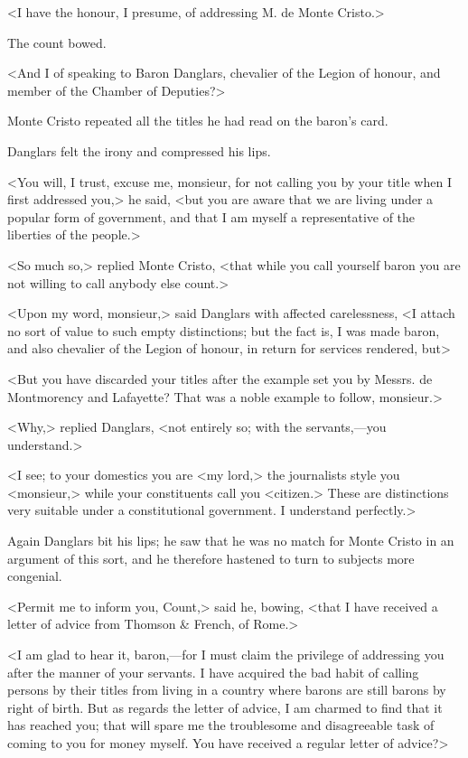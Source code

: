  <I have the honour, I presume, of addressing M. de Monte Cristo.> 

 The count bowed. 

 <And I of speaking to Baron Danglars, chevalier of the Legion of honour, and member of the Chamber of Deputies?> 

 Monte Cristo repeated all the titles he had read on the baron's card. 

 Danglars felt the irony and compressed his lips. 

 <You will, I trust, excuse me, monsieur, for not calling you by your title when I first addressed you,> he said, <but you are aware that we are living under a popular form of government, and that I am myself a representative of the liberties of the people.> 

 <So much so,> replied Monte Cristo, <that while you call yourself baron you are not willing to call anybody else count.> 

 <Upon my word, monsieur,> said Danglars with affected carelessness, <I attach no sort of value to such empty distinctions; but the fact is, I was made baron, and also chevalier of the Legion of honour, in return for services rendered, but\longdash> 

 <But you have discarded your titles after the example set you by Messrs. de Montmorency and Lafayette? That was a noble example to follow, monsieur.> 

 <Why,> replied Danglars, <not entirely so; with the servants,—you understand.> 

 <I see; to your domestics you are <my lord,> the journalists style you <monsieur,> while your constituents call you <citizen.> These are distinctions very suitable under a constitutional government. I understand perfectly.> 

 Again Danglars bit his lips; he saw that he was no match for Monte Cristo in an argument of this sort, and he therefore hastened to turn to subjects more congenial. 

 <Permit me to inform you, Count,> said he, bowing, <that I have received a letter of advice from Thomson \& French, of Rome.> 

 <I am glad to hear it, baron,—for I must claim the privilege of addressing you after the manner of your servants. I have acquired the bad habit of calling persons by their titles from living in a country where barons are still barons by right of birth. But as regards the letter of advice, I am charmed to find that it has reached you; that will spare me the troublesome and disagreeable task of coming to you for money myself. You have received a regular letter of advice?> 

